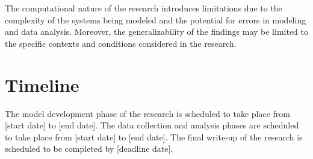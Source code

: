 The computational nature of the research introduces limitations due to the complexity of the systems being modeled and the potential for errors in modeling and data analysis. Moreover, the generalizability of the findings may be limited to the specific contexts and conditions considered in the research.

\section{Timeline}

The model development phase of the research is scheduled to take place from [start date] to [end date]. The data collection and analysis phases are scheduled to take place from [start date] to [end date]. The final write-up of the research is scheduled to be completed by [deadline date].